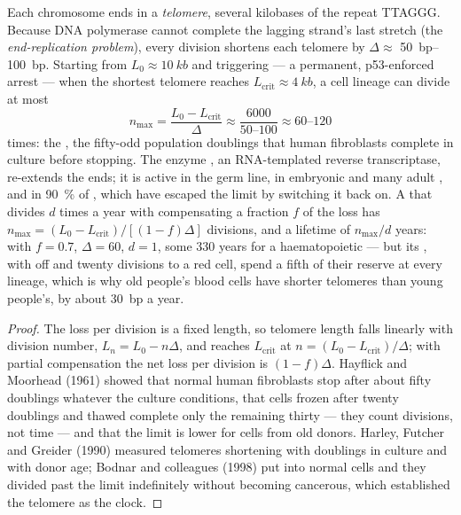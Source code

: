 \begin{theorem}\label{thm:b3:stem-cells:hayflick}
Each chromosome ends in a \emph{telomere}, several kilobases of the
repeat TTAGGG. Because DNA polymerase cannot complete the lagging
strand's last stretch (the \emph{end-replication problem}), every
division shortens each telomere by $\Delta \approx$ \qtyrange{50}{100}{bp}.
Starting from $L_{0} \approx \qty{10}{kb}$ and triggering
\emph{} --- a permanent, p53-enforced arrest ---
when the shortest telomere reaches $L_{\text{crit}} \approx \qty{4}{kb}$,
a cell lineage can divide at most
\[
n_{\max} = \frac{L_{0} - L_{\text{crit}}}{\Delta} \approx \frac{6000}{50\text{--}100} \approx 60\text{--}120
\]
times: the \emph{}, the fifty-odd population doublings
that human fibroblasts complete in culture before stopping. The
enzyme \emph{}, an RNA-templated reverse transcriptase,
re-extends the ends; it is active in the germ line, in embryonic and
many adult , and in \qty{90}{\%} of , which have
escaped the limit by switching it back on. A  that divides
$d$ times a year with  compensating a fraction $f$ of the
loss has $n_{\max} = (L_{0} - L_{\text{crit}})/[(1 - f)\Delta]$
divisions, and a lifetime of $n_{\max}/d$ years: with $f = 0.7$, $\Delta
= 60$, $d = 1$, some 330 years for a haematopoietic  --- but
its , with  off and twenty divisions to a red
cell, spend a fifth of their reserve at every lineage, which is why
old people's blood cells have shorter telomeres than young people's,
by about \qty{30}{bp} a year.
\end{theorem}
\begin{proof}
The loss per division is a fixed length, so telomere length falls
linearly with division number, $L_{n} = L_{0} - n\Delta$, and reaches
$L_{\text{crit}}$ at $n = (L_{0} - L_{\text{crit}})/\Delta$; with
partial compensation the net loss per division is $(1 - f)\Delta$.
Hayflick and Moorhead (1961) showed that normal human fibroblasts stop
after about fifty doublings whatever the culture conditions, that
cells frozen after twenty doublings and thawed complete only the
remaining thirty --- they count divisions, not time --- and that the
limit is lower for cells from old donors. Harley, Futcher and Greider
(1990) measured telomeres shortening with doublings in culture and with
donor age; Bodnar and colleagues (1998) put  into normal
cells and they divided past the limit indefinitely without becoming
cancerous, which established the telomere as the clock.
\end{proof}

